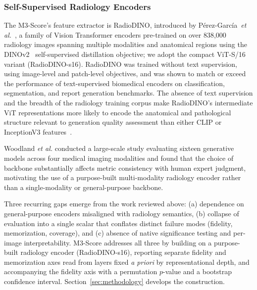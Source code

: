 \documentclass[lettersize,journal]{IEEEtran}
\begin{document}
\subsubsection{Self-Supervised Radiology Encoders}
\label{sec:related_encoders}

The M3-Score's feature extractor is RadioDINO, introduced by
P\'{e}rez-Garc\'{i}a~\textit{et al.}~\cite{perezrad}, a family of Vision
Transformer encoders pre-trained on over 838,000 radiology images spanning
multiple modalities and anatomical regions using the
DINOv2~\cite{oquab2023dinov2} self-supervised distillation objective; we
adopt the compact ViT-S/16 variant (RadioDINO-s16). RadioDINO was trained without text
supervision, using image-level and patch-level objectives, and was shown to
match or exceed the performance of text-supervised biomedical encoders on
classification, segmentation, and report generation benchmarks. The absence
of text supervision and the breadth of the radiology training corpus make
RadioDINO's intermediate ViT representations more likely to encode the anatomical and pathological structure relevant to generation quality assessment than either CLIP or InceptionV3 features~\cite{perezrad}.

Woodland \textit{et al.} \cite{woodland2024feature} conducted a large-scale study evaluating sixteen generative models across four medical imaging modalities and found that the choice of backbone substantially affects metric consistency with human expert judgment, motivating the use of a purpose-built multi-modality radiology encoder rather than a single-modality or general-purpose backbone.

Three recurring gaps emerge from the work reviewed above:
(a) dependence on general-purpose encoders misaligned with radiology semantics,
(b) collapse of evaluation into a single scalar that conflates distinct
failure modes (fidelity, memorization, coverage), and
(c) absence of native significance testing and per-image interpretability.
M3-Score addresses all three by building on a purpose-built radiology
encoder (RadioDINO-s16), reporting separate fidelity and memorization axes
read from layers fixed \emph{a priori} by representational depth, and
accompanying the fidelity axis with a permutation $p$-value and a bootstrap
confidence interval. Section~\ref{sec:methodology} develops the construction.

\end{document}
